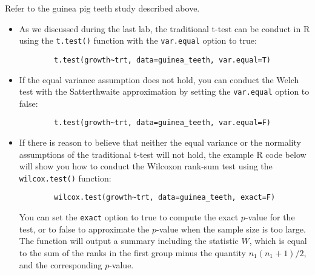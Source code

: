 \documentclass[11pt]{article}
\begin{document}
Refer to the guinea pig teeth study described above. 
\begin{itemize}
	\item As we discussed during the last lab, the traditional t-test can be conduct in R using the \texttt{t.test()} function with the \texttt{var.equal} option to true:
	\begin{verbatim}
		t.test(growth~trt, data=guinea_teeth, var.equal=T)
	\end{verbatim}
	\item If the equal variance assumption does not hold, you can conduct the Welch test with the Satterthwaite approximation by setting the \texttt{var.equal} option to false:
	\begin{verbatim}
		t.test(growth~trt, data=guinea_teeth, var.equal=F)
	\end{verbatim}
	\item If there is reason to believe that neither the equal variance or the normality assumptions of the traditional t-test will not hold, the example R code below will show you how to conduct the Wilcoxon rank-sum test using the \texttt{wilcox.test()} function:
	\begin{verbatim}
		wilcox.test(growth~trt, data=guinea_teeth, exact=F)
	\end{verbatim}
	You can set the \texttt{exact} option to true to compute the exact $p$-value for the test, or to false to approximate the $p$-value when the sample size is too large. The function will output a summary including the statistic $W$, which is equal to the sum of the ranks in the first group minus the quantity $n_1(n_1+1)/2$, and the corresponding $p$-value.
\end{itemize}

\newpage
\end{document}
